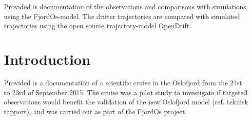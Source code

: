 \documentclass[12pt,a4paper,english]{article}
\begin{document}
Provided is documentation of the observations and comparisons with simulations using the FjordOs-model. 
The drifter trajectories are compared with simulated trajectories using the open source trajectory-model OpenDrift.

\clearpage

\vfill


\clearpage
\tableofcontents

\clearpage

\section{Introduction}
Provided is a documentation of a scientific cruise in the Oslofjord from the 21st to 23rd of September 2015. The cruise was a pilot study to investigate if targeted observations would benefit the validation of the new Oslofjord model (ref. teknisk rapport), and was carried out as part of the FjordOs project.
\end{document}
